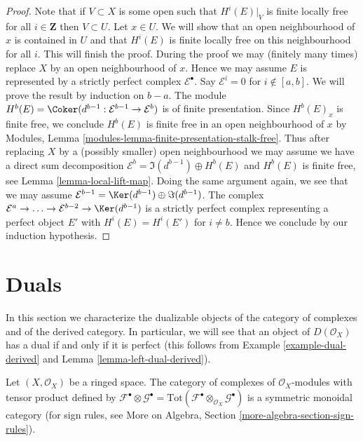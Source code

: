 \begin{proof}
Note that if $V \subset X$ is some open such that $H^i(E)|_V$
is finite locally free for all $i \in \mathbf{Z}$ then $V \subset U$.
Let $x \in U$. We will show that an open neighbourhood of $x$
is contained in $U$ and that $H^i(E)$ is finite locally free
on this neighbourhood for all $i$. This will finish the proof.
During the proof we may (finitely many times) replace
$X$ by an open neighbourhood of $x$.
Hence we may assume $E$ is represented
by a strictly perfect complex $\mathcal{E}^\bullet$. Say
$\mathcal{E}^i = 0$ for $i \not \in [a, b]$. We will
prove the result by induction on $b - a$. The module
$H^b(E) = \Coker(d^{b - 1} : \mathcal{E}^{b - 1} \to \mathcal{E}^b)$
is of finite presentation. Since $H^b(E)_x$ is finite free,
we conclude $H^b(E)$ is finite free in an open neighbourhood of $x$ by
Modules, Lemma \ref{modules-lemma-finite-presentation-stalk-free}.
Thus after replacing $X$ by a (possibly smaller) open
neighbourhood we may assume we have a direct sum decomposition
$\mathcal{E}^b = \Im(d^{b - 1}) \oplus H^b(E)$ and
$H^b(E)$ is finite free, see Lemma \ref{lemma-local-lift-map}.
Doing the same argument again, we see that we may
assume $\mathcal{E}^{b - 1} = \Ker(d^{b - 1}) \oplus \Im(d^{b - 1})$.
The complex
$\mathcal{E}^a \to \ldots \to \mathcal{E}^{b - 2} \to \Ker(d^{b - 1})$
is a strictly perfect complex representing a perfect
object $E'$ with $H^i(E) = H^i(E')$ for $i \not = b$.
Hence we conclude by our induction hypothesis.
\end{proof}






\section{Duals}
\label{section-duals}

\noindent
In this section we characterize the dualizable objects of
the category of complexes and of the derived category.
In particular, we will see that an object of $D(\mathcal{O}_X)$
has a dual if and only if it is perfect (this follows from
Example \ref{example-dual-derived} and
Lemma \ref{lemma-left-dual-derived}).

\begin{lemma}
\label{lemma-symmetric-monoidal-cat-complexes}
Let $(X, \mathcal{O}_X)$ be a ringed space. The category of complexes
of $\mathcal{O}_X$-modules with tensor product defined by
$\mathcal{F}^\bullet \otimes \mathcal{G}^\bullet =
\text{Tot}(\mathcal{F}^\bullet \otimes_{\mathcal{O}_X} \mathcal{G}^\bullet)$
is a symmetric monoidal category (for sign rules, see
More on Algebra, Section \ref{more-algebra-section-sign-rules}).
\end{lemma}

